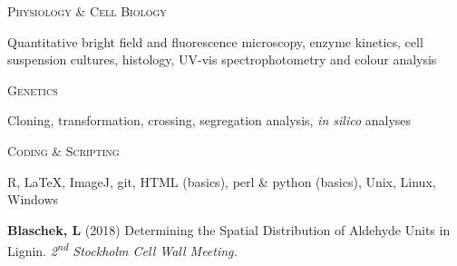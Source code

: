 \documentclass[11pt]{article}
\begin{document}
\vspace{0.2cm}

\textsc{\large{Physiology \& Cell Biology}} 
\begin{addmargin}[24pt]{0pt}
	Quantitative bright field and fluorescence microscopy, enzyme kinetics, cell suspension cultures, histology, UV-vis spectrophotometry and colour analysis 
\end{addmargin}
\vspace{0.2cm}

\textsc{\large{Genetics}} 
\begin{addmargin}[24pt]{0pt}
	Cloning, transformation, crossing, segregation analysis, \textit{in silico} analyses
\end{addmargin}	
\vspace{0.2cm}

\textsc{\large{Coding \& Scripting}}
\begin{addmargin}[24pt]{0pt}
	R, \LaTeX, ImageJ, git, HTML (basics), perl \& python (basics), Unix, Linux, Windows
\vspace{1cm}
\end{addmargin}

\vspace{0.2cm}

\begin{addmargin}[24pt]{0pt}
\textbf{Blaschek, L} (2018) Determining the Spatial Distribution of Aldehyde Units in Lignin. \textit{2\textsuperscript{nd} Stockholm Cell Wall Meeting.}
\end{addmargin}
\vspace{0.2cm}
\end{document}
